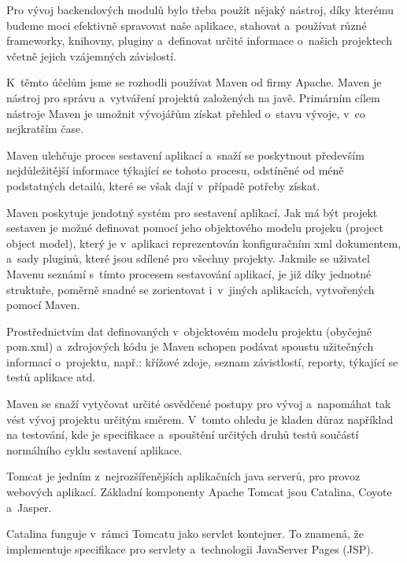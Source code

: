 \documentclass[12pt]{article}
\begin{document}

Pro vývoj backendových modulů bylo třeba použít nějaký nástroj,
díky kterému budeme moci efektivně spravovat naše aplikace,
stahovat a~používat různé frameworky, knihovny, pluginy 
a~definovat určité informace o~našich projektech včetně jejich vzájemných závislostí. 

K~těmto účelům jsme se rozhodli používat Maven od firmy Apache.
Maven je nástroj pro správu a~vytváření projektů založených na javě.
Primárním cílem nástroje Maven je umožnit vývojářům získat přehled o~stavu 
vývoje, v~co nejkratším čase. 

Maven ulehčuje proces sestavení aplikací a~snaží se poskytnout především 
nejdůležitější informace týkající se tohoto procesu,
odstíněné od méně podstatných detailů,
které se však dají v~případě potřeby získat. 

Maven poskytuje jendotný systém pro sestavení aplikací. 
Jak má být projekt sestaven je možné definovat pomocí 
jeho objektového modelu projeku (project object model),
který je v~aplikaci reprezentován konfiguračním xml dokumentem, 
a~sady pluginů, které jsou sdílené pro všechny projekty.
Jakmile se uživatel Mavenu seznámí s~tímto procesem sestavování aplikací,
je již díky jednotné struktuře, poměrně snadné se zorientovat i~v~jiných aplikacích,
vytvořených pomocí Maven.

Prostřednictvím dat definovaných v~objektovém modelu projektu (obyčejně pom.xml)
a~zdrojových kódu je Maven schopen podávat spoustu užitečných informací o~projektu,
např.: křížové zdoje, seznam závistlostí, reporty, týkající se testů aplikace atd.

Maven se snaží vytyčovat určité osvědčené postupy pro vývoj
a~napomáhat tak vést vývoj projektu určitým směrem. 
V~tomto ohledu je kladen důraz například na testování,
kde je specifikace a~spouštění určitých druhů testů
součástí normálního cyklu sestavení aplikace.



Tomcat je jedním z~nejrozšířenějších aplikačních java serverů, 
pro provoz webových aplikací. 
Základní komponenty Apache Tomcat jsou Catalina, Coyote a~Jasper.

Catalina funguje v~rámci Tomcatu jako servlet kontejner. 
To znamená, že implementuje specifikace pro servlety a~technologii JavaServer Pages (JSP).
\end{document}
